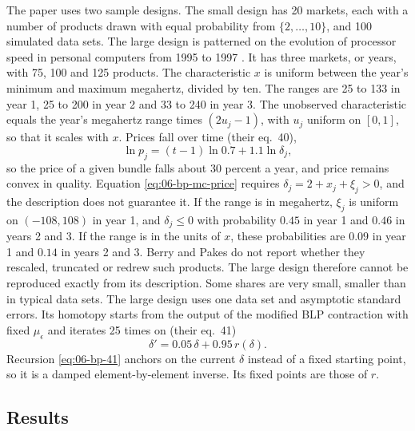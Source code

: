 The paper uses two sample designs. The small design has 20 markets, each with a number of products drawn with equal
probability from $\{2, \dots, 10\}$, and 100 simulated data sets. The large design is patterned on the evolution of processor
speed in personal computers from 1995 to 1997 \citep{Pakes2003}. It has three markets, or years, with 75, 100 and 125
products. The characteristic $x$ is uniform between the year's minimum and maximum megahertz, divided by ten. The ranges
are 25 to 133 in year 1, 25 to 200 in year 2 and 33 to 240 in year 3. The unobserved characteristic equals the year's
megahertz range times $(2u_j - 1)$, with $u_j$ uniform on $[0, 1]$, so that it scales with $x$. Prices fall over time
(their eq.~40),
\begin{equation}\label{eq:06-bp-mc-price}
  \ln p_j = (t - 1)\ln 0.7 + 1.1 \ln \delta_j ,
\end{equation}
so the price of a given bundle falls about 30 percent a year, and price remains convex in quality. Equation
\eqref{eq:06-bp-mc-price} requires $\delta_j = 2 + x_j + \xi_j > 0$, and the description does not guarantee it. If the
range is in megahertz, $\xi_j$ is uniform on $(-108, 108)$ in year 1, and $\delta_j \le 0$ with probability $0.45$ in
year 1 and $0.46$ in years 2 and 3. If the range is in the units of $x$, these probabilities are $0.09$ in year 1 and
$0.14$ in years 2 and 3. Berry and Pakes do not report whether they rescaled, truncated or redrew such products. The
large design therefore cannot be reproduced exactly from its description. Some shares are very small, smaller
than in typical data sets. The large design uses one data set and asymptotic standard errors. Its
homotopy starts from the output of the modified BLP contraction with fixed $\mu_\epsilon$ and iterates 25 times on (their
eq.~41)
\begin{equation}\label{eq:06-bp-41}
  \delta' = 0.05\,\delta + 0.95\, r(\delta) .
\end{equation}
Recursion \eqref{eq:06-bp-41} anchors on the current $\delta$ instead of a fixed starting point, so it is a damped
element-by-element inverse. Its fixed points are those of $r$.

\subsection{Results}\label{sec:06-bp-results}

